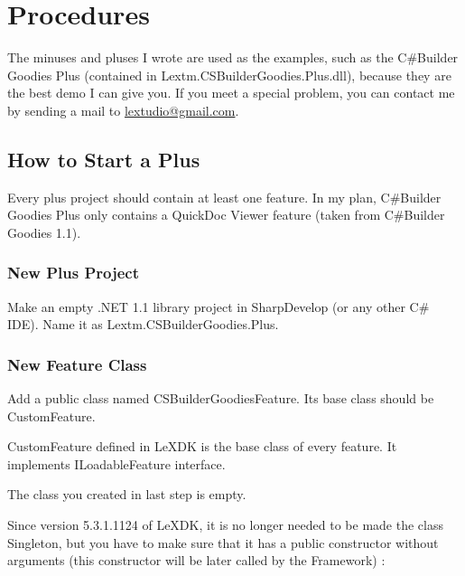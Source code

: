 
\chapter{Procedures}
\newpage

The minuses and pluses I wrote are used as the examples, such as the C\#Builder 
Goodies Plus (contained in Lextm.CSBuilderGoodies.Plus.dll), because they are 
the best demo I can give you. If you meet a special problem, you can contact me 
by sending a mail to \underline{lextudio@gmail.com}.
 
\section{How to Start a Plus}

Every plus project should contain at least one feature. In my plan, C\#Builder 
Goodies Plus only contains a QuickDoc Viewer feature (taken from C\#Builder 
Goodies 1.1).

\subsection{New Plus Project}
Make an empty .NET 1.1 library project in SharpDevelop (or any other C\# IDE).
Name it as Lextm.CS\-Builder\-Goodies.Plus.


\subsection{New Feature Class}
Add a public class named CSBuilderGoodiesFeature. Its base class should be 
CustomFeature.


CustomFeature defined in LeXDK is the base class of every feature. It 
implements ILoadableFeature interface.

The class you created in last step is empty.

Since version 5.3.1.1124 of LeXDK, it is no longer needed to be made the class 
Singleton, but you have to make sure that it has a public constructor without 
arguments (this constructor will be later called by the Framework) :


